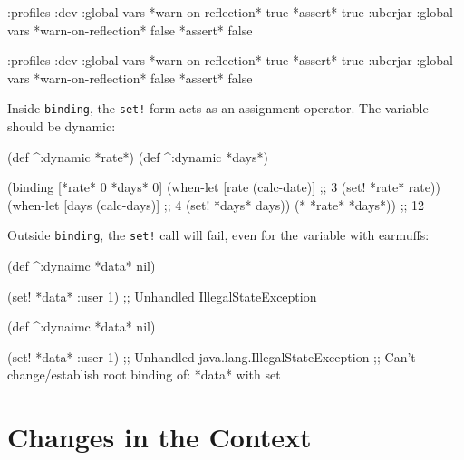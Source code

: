 \ifx\DEVICETYPE\MOBILE

\begin{clojure}
{:profiles
 :dev {:global-vars
       {*warn-on-reflection* true
        *assert* true}}
 :uberjar {:global-vars
           {*warn-on-reflection* false
            *assert* false}}}
\end{clojure}

\else

\begin{clojure}
{:profiles
 :dev {:global-vars {*warn-on-reflection* true
                     *assert* true}}
 :uberjar {:global-vars {*warn-on-reflection* false
                         *assert* false}}}
\end{clojure}

\fi

Inside \verb|binding|, the \verb|set!| form acts as an assignment operator.
The variable should be dynamic:

\begin{clojure}
(def ^:dynamic *rate*)
(def ^:dynamic *days*)

(binding [*rate* 0
          *days* 0]
  (when-let [rate (calc-date)] ;; 3
    (set! *rate* rate))
  (when-let [days (calc-days)] ;; 4
    (set! *days* days))
  (* *rate* *days*))
;; 12
\end{clojure}

\noindent
Outside \verb|binding|, the \verb|set!| call will fail, even for the variable with earmuffs:

\ifx\DEVICETYPE\MOBILE

\begin{clojure}
(def ^:dynaimc *data* nil)

(set! *data* {:user 1})
;; Unhandled IllegalStateException
\end{clojure}

\else

\begin{clojure}
(def ^:dynaimc *data* nil)

(set! *data* {:user 1})
;; Unhandled java.lang.IllegalStateException
;; Can't change/establish root binding of: *data* with set
\end{clojure}

\fi

\section{Changes in the Context}


